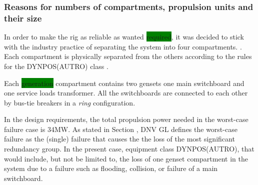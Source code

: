 \subsubsection*{Reasons for numbers of compartments, propulsion units and their size}
In order to make the rig as reliable as wanted \colorbox{green}{required}, it was decided to stick with the industry practice of separating the system into four compartments. . Each compartment is physically separated from the others according to the rules for the DYNPOS(AUTRO) class \cite{RulesShipsDNVGLPart6Chap3}. 

Each \colorbox{green}{generation} compartment contains two gensets one main switchboard and one service loads transformer. All the switchboards are connected to each other by bus-tie breakers in a \textit{ring} configuration. 



In the design requirements, the total propulsion power needed in the worst-case failure case is 34MW. As stated in Section , DNV GL defines the worst-case failure as the (single) failure that causes the the loss of the most significant redundancy group. In the present case, equipment class DYNPOS(AUTRO), that would include, but not be limited to, the loss of one genset compartment in the system due to a failure such as flooding, collision, or failure of a main switchboard.




